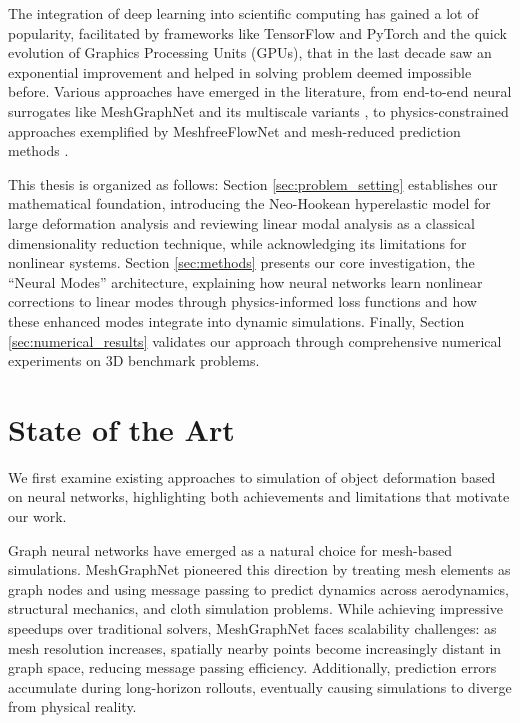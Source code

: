 The integration of deep learning into scientific computing has gained a lot of popularity, facilitated by frameworks like TensorFlow \cite{tensorflow2015-whitepaper} and PyTorch \cite{paszke2019pytorchimperativestylehighperformance} and the quick evolution of Graphics Processing Units (GPUs), that in the last decade saw an exponential improvement and helped in solving problem deemed impossible before. Various approaches have emerged in the literature, from end-to-end neural surrogates like MeshGraphNet \cite{pfaffLearningMeshBasedSimulation2021a} and its multiscale variants \cite{fortunatoMultiScaleMeshGraphNets2022}, to physics-constrained approaches exemplified by MeshfreeFlowNet \cite{jiangMeshfreeFlowNetPhysicsConstrainedDeep2020} and mesh-reduced prediction methods \cite{hanPredictingPhysicsMeshreduced2022a}.


This thesis is organized as follows: Section \ref{sec:problem_setting} establishes our mathematical foundation, introducing the Neo-Hookean hyperelastic model for large deformation analysis and reviewing linear modal analysis as a classical dimensionality reduction technique, while acknowledging its limitations for nonlinear systems. Section \ref{sec:methods} presents our core investigation, the ``Neural Modes'' architecture, explaining how neural networks learn nonlinear corrections to linear modes through physics-informed loss functions and how these enhanced modes integrate into dynamic simulations. Finally, Section \ref{sec:numerical_results} validates our approach through comprehensive numerical experiments on 3D benchmark problems.

\section*{State of the Art}

We first examine existing approaches to simulation of object deformation based on neural networks, highlighting both achievements and limitations that motivate our work.

Graph neural networks have emerged as a natural choice for mesh-based simulations. MeshGraphNet \cite{pfaffLearningMeshBasedSimulation2021a} pioneered this direction by treating mesh elements as graph nodes and using message passing to predict dynamics across aerodynamics, structural mechanics, and cloth simulation problems. While achieving impressive speedups over traditional solvers, MeshGraphNet faces scalability challenges: as mesh resolution increases, spatially nearby points become increasingly distant in graph space, reducing message passing efficiency. Additionally, prediction errors accumulate during long-horizon rollouts, eventually causing simulations to diverge from physical reality.

